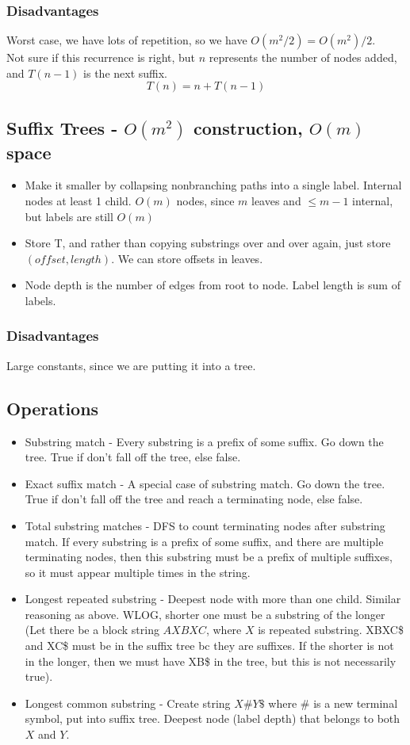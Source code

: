 \documentclass{article}
\begin{document}
\subsubsection{Disadvantages}
Worst case, we have lots of repetition, so we have $O(m^2/2) = O(m^2)/2$.\\
Not sure if this recurrence is right, but $n$ represents the number of nodes added, and $T(n-1)$ is the next suffix.
$$T(n) = n + T(n-1)$$

\subsection{Suffix Trees - $O(m^2)$ construction, $O(m)$ space}
\begin{itemize}
    \item Make it smaller by collapsing nonbranching paths into a single label. Internal nodes at least 1 child. $O(m)$ nodes, since $m$ leaves and $\leq m-1$ internal, but labels are still $O(m)$
    \item Store T, and rather than copying substrings over and over again, just store $(offset, length)$. We can store offsets in leaves.
    \item Node depth is the number of edges from root to node. Label length is sum of labels.
\end{itemize}
\subsubsection{Disadvantages}
Large constants, since we are putting it into a tree.

\subsection{Operations}
\begin{itemize}
    \item Substring match - Every substring is a prefix of some suffix. Go down the tree. True if don't fall off the tree, else false.
    \item Exact suffix match - A special case of substring match. Go down the tree. True if don't fall off the tree and reach a terminating node, else false.
    \item Total substring matches - DFS to count terminating nodes after substring match. If every substring is a prefix of some suffix, and there are multiple terminating nodes, then this substring must be a prefix of multiple suffixes, so it must appear multiple times in the string.
    \item Longest repeated substring - Deepest node with more than one child. Similar reasoning as above. WLOG, shorter one must be a substring of the longer (Let there be a block string $AXBXC$, where $X$ is repeated substring. XBXC\$ and XC\$ must be in the suffix tree bc they are suffixes. If the shorter is not in the longer, then we must have XB\$ in the tree, but this is not necessarily true).
    \item Longest common substring - Create string $X\#Y\$$ where $\#$ is a new terminal symbol, put into suffix tree. Deepest node (label depth) that belongs to both $X$ and $Y$.
\end{itemize}
\end{document}
